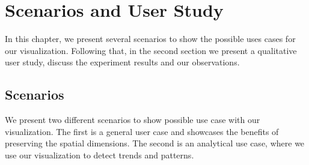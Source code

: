 
\chapter{Scenarios and User Study}
In this chapter, we present several scenarios to show the possible uses cases
for our visualization. Following that, in the second section we present a
qualitative user study, discuss the experiment results and our observations.

\section{Scenarios}
We present two different scenarios to show possible use case with our
visualization. The first is a general user case and showcases the benefits of
preserving the spatial dimensions. The second is an analytical use case, where
we use our visualization to detect trends and patterns.

